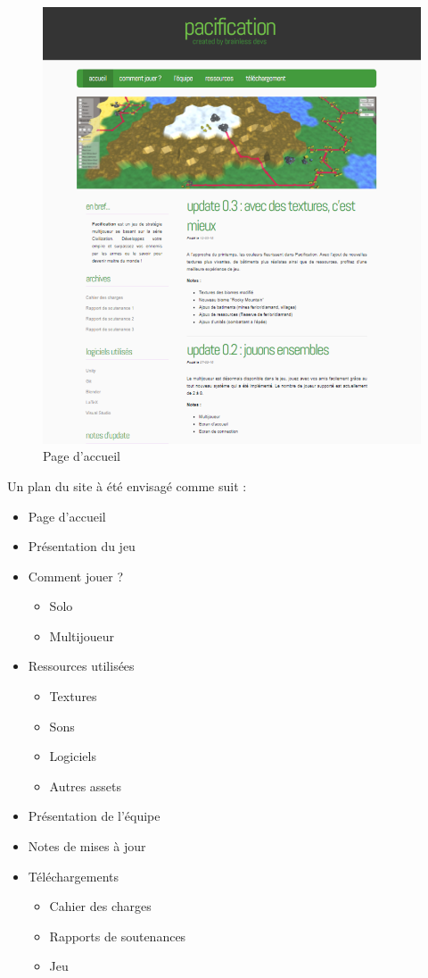\documentclass[12pt]{report}
\begin{document}
\begin{figure}[H]
    \centering
    \includegraphics[scale=0.45]{homepage}
    \caption{Page d'accueil}
\end{figure}

\newpage

Un plan du site à été envisagé comme suit :

\begin{itemize}
\item Page d'accueil
\item Présentation du jeu
\item Comment jouer ?
    \begin{itemize}
    \item Solo
    \item Multijoueur
    \end{itemize}
\item Ressources utilisées
    \begin{itemize}
    \item Textures
    \item Sons
    \item Logiciels
    \item Autres assets
    \end{itemize}
\item Présentation de l'équipe
\item Notes de mises à jour
\item Téléchargements
    \begin{itemize}
    \item Cahier des charges
    \item Rapports de soutenances
    \item Jeu
    \end{itemize}
\end{itemize}
\end{document}
